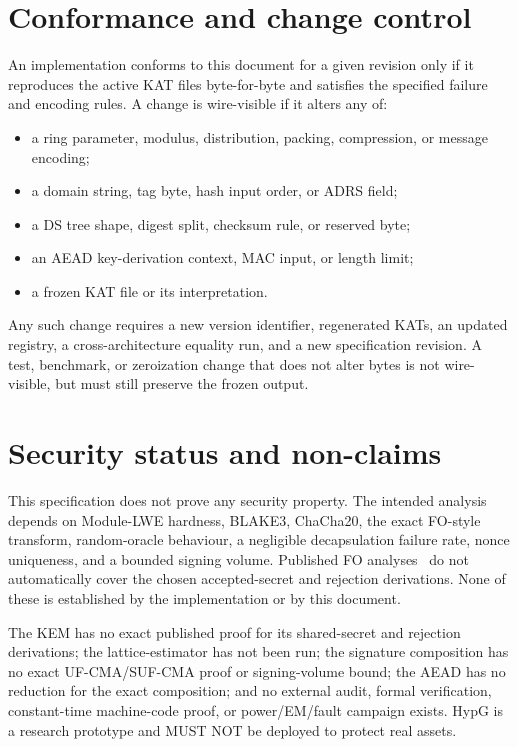 \documentclass[11pt,a4paper]{article}
\theoremstyle{plain}
\theoremstyle{definition}
\theoremstyle{remark}
\begin{document}
\section{Conformance and change control}
\label{sec:conformance}

An implementation conforms to this document for a given revision only
if it reproduces the active KAT files byte-for-byte and satisfies the
specified failure and encoding rules.  A change is wire-visible if it
alters any of:

\begin{itemize}[leftmargin=*]
\item a ring parameter, modulus, distribution, packing, compression, or
  message encoding;
\item a domain string, tag byte, hash input order, or ADRS field;
\item a DS tree shape, digest split, checksum rule, or reserved byte;
\item an AEAD key-derivation context, MAC input, or length limit;
\item a frozen KAT file or its interpretation.
\end{itemize}

Any such change requires a new version identifier, regenerated KATs, an
updated registry, a cross-architecture equality run, and a new
specification revision.  A test, benchmark, or zeroization change that
does not alter bytes is not wire-visible, but must still preserve the
frozen output.

\section{Security status and non-claims}
\label{sec:security}

This specification does not prove any security property.  The intended
analysis depends on Module-LWE hardness, BLAKE3, ChaCha20, the exact
FO-style transform, random-oracle behaviour, a negligible decapsulation
failure rate, nonce uniqueness, and a bounded signing volume.
Published FO analyses~\cite{fo99,hhk17} do not automatically cover the
chosen accepted-secret and rejection derivations.  None of
these is established by the implementation or by this document.

The KEM has no exact published proof for its shared-secret and
rejection derivations; the lattice-estimator has not been run; the
signature composition has no exact UF-CMA/SUF-CMA proof or
signing-volume bound; the AEAD has no reduction for the exact
composition; and no external audit, formal verification, constant-time
machine-code proof, or power/EM/fault campaign exists.  HypG is a
research prototype and MUST NOT be deployed to protect real assets.
\end{document}

